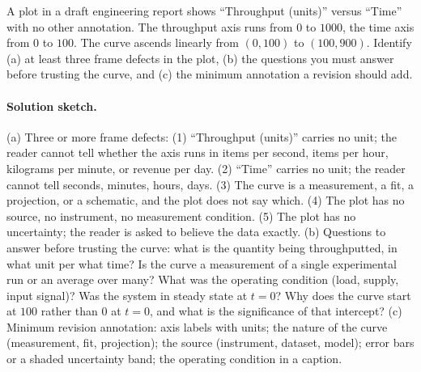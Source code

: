 \begin{exercise}
A plot in a draft engineering report shows ``Throughput (units)''
versus ``Time'' with no other annotation. The throughput axis runs
from $0$ to $1000$, the time axis from $0$ to $100$. The curve
ascends linearly from $(0, 100)$ to $(100, 900)$. Identify (a) at
least three frame defects in the plot, (b) the questions you must
answer before trusting the curve, and (c) the minimum annotation a
revision should add.

\paragraph{Solution sketch.}
(a) Three or more frame defects: (1) ``Throughput (units)'' carries
no unit; the reader cannot tell whether the axis runs in items per
second, items per hour, kilograms per minute, or revenue per day.
(2) ``Time'' carries no unit; the reader cannot tell seconds,
minutes, hours, days. (3) The curve is a measurement, a fit, a
projection, or a schematic, and the plot does not say which.
(4) The plot has no source, no instrument, no measurement
condition. (5) The plot has no uncertainty; the reader is asked to
believe the data exactly.
(b) Questions to answer before trusting the curve: what is the
quantity being throughputted, in what unit per what time? Is the
curve a measurement of a single experimental run or an average
over many? What was the operating condition (load, supply, input
signal)? Was the system in steady state at $t = 0$? Why does the
curve start at $100$ rather than $0$ at $t = 0$, and what is the
significance of that intercept?
(c) Minimum revision annotation: axis labels with units; the
nature of the curve (measurement, fit, projection); the source
(instrument, dataset, model); error bars or a shaded uncertainty
band; the operating condition in a caption.
\end{exercise}

